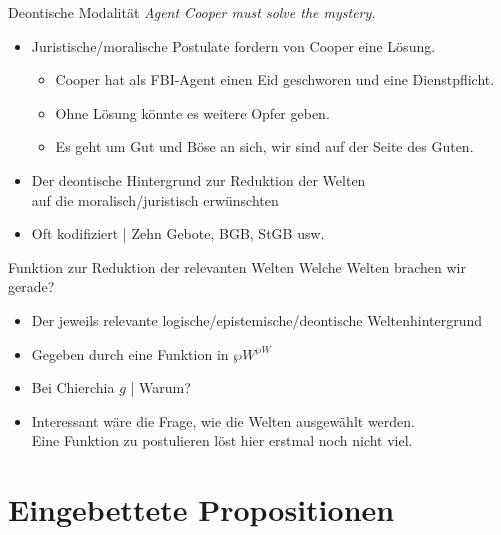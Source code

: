 \begin{frame}
  {Deontische Modalität}
  \onslide<+->
  \onslide<+->
  \textit{Agent Cooper \alert{must} solve the mystery.}\\
  \Halbzeile
  \begin{itemize}[<+->]
    \item \alert{Juristische\slash moralische Postulate} fordern von Cooper eine Lösung.\\
      \begin{itemize}[<+->]
        \item Cooper hat als FBI-Agent einen Eid geschworen und eine Dienstpflicht.
        \item Ohne Lösung könnte es weitere Opfer geben.
        \item Es geht um Gut und Böse an sich, wir sind auf der Seite des Guten.
      \end{itemize}
      \Halbzeile
    \item Der \alert{deontische Hintergrund} zur \alert{Reduktion der Welten\\
      auf die moralisch\slash juristisch erwünschten}
    \item Oft kodifiziert | Zehn Gebote, BGB, StGB usw.
  \end{itemize}
\end{frame}

\begin{frame}
  {Funktion zur Reduktion der relevanten Welten}
  \onslide<+->
  \onslide<+->
  Welche Welten brachen wir gerade?\\
  \Halbzeile
  \begin{itemize}[<+->]
    \item Der jeweils relevante logische\slash epistemische\slash deontische Weltenhintergrund
    \item Gegeben durch \alert{eine Funktion in $\wp W^{\wp W}$} 
      \Halbzeile
    \item Bei Chierchia $g$ | Warum?
      \Halbzeile
    \item Interessant wäre die Frage, wie die Welten ausgewählt werden.\\
      Eine Funktion zu postulieren löst hier erstmal noch nicht viel.
  \end{itemize}
\end{frame}


\section{Eingebettete Propositionen}


